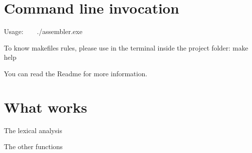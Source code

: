 \hypertarget{index_sec0}{}\section{Command line invocation}\label{index_sec0}
Usage\+: ~\newline
 ~\newline
 ./assembler.exe

To know makefile\textquotesingle{}s rules, please use in the terminal inside the project folder\+: make help

You can read the Readme for more information.\hypertarget{index_sec1}{}\section{What works}\label{index_sec1}

\begin{DoxyItemize}
\item The lexical analysis ~\newline

\item The other functions ~\newline
 
\end{DoxyItemize}
